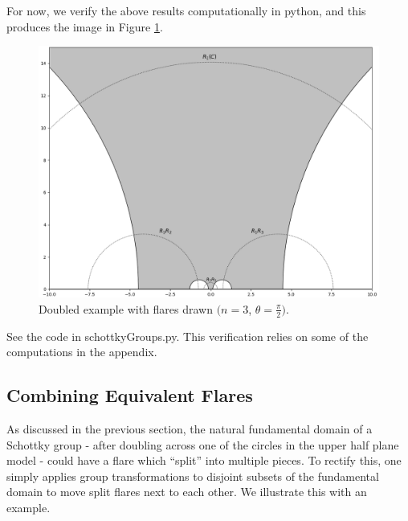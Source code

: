 \documentclass[]{article}
\begin{document}
For now, we verify the above results computationally in python, and this produces the image in Figure \ref{flares}.
\begin{figure}[h]
	\centering
	\includegraphics[width=\linewidth]{flares.png}
	\caption{Doubled example with flares drawn $(n = 3$, $\theta = \frac{\pi}{2})$.}
	\label{flares}
\end{figure}
See the code in schottkyGroups.py.
This verification relies on some of the computations in the appendix.

\clearpage

\subsection*{Combining Equivalent Flares}

As discussed in the previous section, the natural fundamental domain of a Schottky group - after doubling across one of the circles in the upper half plane model - could have a flare which ``split'' into multiple pieces.
To rectify this, one simply applies group transformations to disjoint subsets of the fundamental domain to move split flares next to each other.
We illustrate this with an example.
\end{document}

